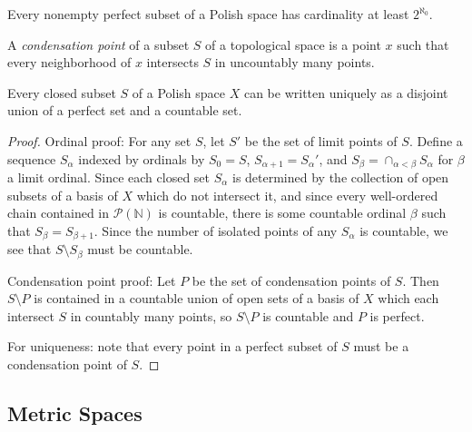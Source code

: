 \begin{thm}[Cantor] Every nonempty perfect subset of a Polish space has cardinality at least $2^{\aleph_0}$.
\end{thm}

\begin{defn} A \emph{condensation point} of a subset $S$ of a topological space is a point $x$ such that every neighborhood of $x$ intersects $S$ in uncountably many points.
\end{defn}

\begin{thm} Every closed subset $S$ of a Polish space $X$ can be written uniquely as a disjoint union of a perfect set and a countable set.
\end{thm}
\begin{proof} Ordinal proof: For any set $S$, let $S'$ be the set of limit points of $S$. Define a sequence $S_\alpha$ indexed by ordinals by $S_0 = S$, $S_{\alpha+1} = S_\alpha'$, and $S_\beta = \cap_{\alpha < \beta} S_\alpha$ for $\beta$ a limit ordinal. Since each closed set $S_\alpha$ is determined by the collection of open subsets of a basis of $X$ which do not intersect it, and since every well-ordered chain contained in $\mathcal{P}(\mathbb{N})$ is countable, there is some countable ordinal $\beta$ such that $S_\beta = S_{\beta+1}$. Since the number of isolated points of any $S_\alpha$ is countable, we see that $S\setminus S_\beta$ must be countable.

Condensation point proof: Let $P$ be the set of condensation points of $S$. Then $S\setminus P$ is contained in a countable union of open sets of a basis of $X$ which each intersect $S$ in countably many points, so $S\setminus P$ is countable and $P$ is perfect.

For uniqueness: note that every point in a perfect subset of $S$ must be a condensation point of $S$.
\end{proof}



\subsection{Metric Spaces}

